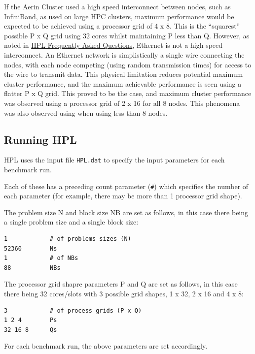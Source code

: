 \documentclass{report}
\begin{document}
If the Aerin Cluster used a high speed interconnect between nodes, such as InfiniBand, as used on large HPC clusters, maximum performance would be expected to be achieved using a processor grid of 4 x 8. This is the ``squarest'' possible P x Q grid using 32 cores whilst maintaining P less than Q. However, as noted in \href{https://www.netlib.org/benchmark/hpl/faqs.html}{HPL Frequently Asked Questions}, Ethernet is not a high speed interconnect. An Ethernet network is simplistically a single wire connecting the nodes, with each node competing (using random transmission times) for access to the wire to transmit data. This physical limitation reduces potential maximum cluster performance, and the maximum achievable performance is seen using a flatter P x Q grid. This proved to be the case, and maximum cluster performance was observed using a processor grid of 2 x 16 for all 8 nodes. This phenomena was also observed using when using less than 8 nodes.


%
%
\subsection{Running HPL}

HPL uses the input file \verb|HPL.dat| to specify the input parameters for each benchmark run.

Each of these has a preceding count parameter (\verb|#|) which specifies the number of each parameter (for example, there may be more than 1 processor grid shape).

The problem size N and block size NB are set as follows, in this case there being a single problem size and a single block size:

\lstset{style=listing}
\begin{lstlisting}[numbers=none, caption=HPL.dat]
1            # of problems sizes (N)
52360        Ns
1            # of NBs
88           NBs
\end{lstlisting}

The processor grid shapre parameters P and Q are set as follows, in this case there being 32 cores/slots with 3 possible grid shapes, 1 x 32, 2 x 16 and 4 x 8:

\lstset{style=listing}
\begin{lstlisting}[numbers=none, caption=HPL.dat]
3            # of process grids (P x Q)
1 2 4        Ps
32 16 8      Qs
\end{lstlisting}

For each benchmark run, the above parameters are set accordingly.
\end{document}
